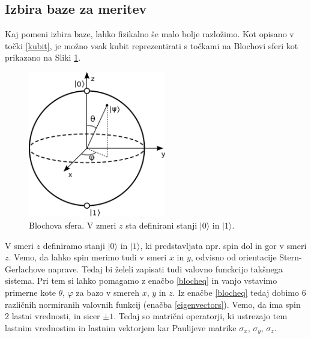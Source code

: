 \documentclass[12pt]{article}
\begin{document}
\subsection{Izbira baze za meritev}

\par Kaj pomeni izbira baze, lahko fizikalno še malo bolje razložimo. Kot opisano v točki \ref{kubit}, je možno vsak kubit reprezentirati s točkami na Blochovi sferi kot prikazano na Sliki \ref{fig:bloch}. 

\begin{figure}[H]
\includegraphics[width=6cm]{bloch.png}
\centering
\caption{Blochova sfera. V zmeri $z$ sta definirani stanji $| 0 \rangle$ in $| 1 \rangle$. \cite{BlochSphere2023}}
\label{fig:bloch}
\end{figure}

V smeri $z$ definiramo stanji $| 0 \rangle$ in $| 1 \rangle$, ki predstavljata npr. spin dol in gor v smeri $z$. Vemo, da lahko spin merimo tudi v smeri $x$ in $y$, odvisno od orientacije Stern-Gerlachove naprave. Tedaj bi želeli zapisati tudi valovno funckcijo takšnega sistema. Pri tem si lahko pomagamo z enačbo \ref{blocheq} in vanjo vstavimo primerne kote $\theta$, $\varphi$ za bazo v smereh $x$, $y$ in $z$. Iz enačbe \ref{blocheq} tedaj dobimo 6 različnih normiranih valovnih funkcij (enačba \ref{eigenvectors}). Vemo, da ima spin 2 lastni vrednosti, in sicer $\pm 1$. Tedaj so matrični operatorji, ki ustrezajo tem lastnim vrednostim in lastnim vektorjem kar Paulijeve matrike $\sigma_x$, $\sigma_y$, $\sigma_z$. \cite{PauliMatrices2023}
\end{document}
